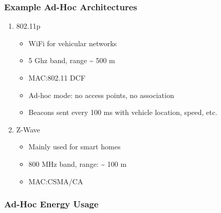 \subsubsection{Example Ad-Hoc Architectures}\label{subsubsec:Ad_Hoc_Architectures}
\begin{enumerate}[noitemsep]
\item 802.11p
  \begin{itemize}[noitemsep]
  \item WiFi for vehicular networks
  \item 5 Ghz band, range \textasciitilde{} 500 m
  \item MAC:\@ 802.11 DCF
  \item Ad-hoc mode: no access points, no association
  \item Beacons sent every 100 ms with vehicle location, speed, etc.
  \end{itemize}

\item Z-Wave
  \begin{itemize}[noitemsep]
  \item Mainly used for smart homes
  \item 800 MHz band, range: \textasciitilde{} 100 m
  \item MAC:\@ CSMA/CA
  \end{itemize}
\end{enumerate}

\subsubsection{Ad-Hoc Energy Usage}\label{subsubsec:Ad_Hoc_Architectures}

